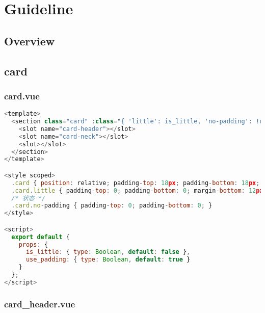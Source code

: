 \part{Guideline}


\chapter{Overview}




\chapter{card}

\section{card.vue}


\begin{lstlisting}[language=JavaScript]
<template>
  <section class="card" :class="{ 'little': is_little, 'no-padding': !use_padding }">
    <slot name="card-header"></slot>
    <slot name="card-neck"></slot>
    <slot></slot>
  </section>
</template>

<style scoped>
  .card { position: relative; padding-top: 18px; padding-bottom: 18px; }
  .card.little { padding-top: 0; padding-bottom: 0; margin-bottom: 12px; }
  /* 状态 */
  .card.no-padding { padding-top: 0; padding-bottom: 0; }
</style>

<script>
  export default {
    props: {
      is_little: { type: Boolean, default: false },
      use_padding: { type: Boolean, default: true }
    }
  };
</script>
\end{lstlisting}

\section{card\_header.vue}



